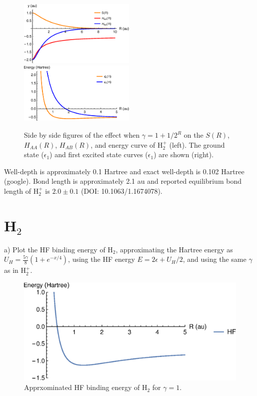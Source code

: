 \documentclass{article}
\begin{document}
\begin{figure}[H]
    \centering
    \includegraphics[width=0.495\textwidth]{h2_gamma.eps}
    \includegraphics[width=0.495\textwidth]{h2_gamma_curve.eps}
    \caption{Side by side figures of the effect when $\gamma= 1 + 1/2^R$
      on the $S(R)$, $H_{AA}(R)$, $H_{AB}(R)$, and energy curve of H$_2^+$ (left).
      The ground state ($\epsilon_1$) and first excited state curves ($\epsilon_1$)
      are shown (right).}
    \label{fig:sidebyside}
\end{figure}

{\color{blue}
  Well-depth is approximately 0.1 Hartree and exact well-depth is 0.102 Hartree
  (google).
  Bond length is approximately 2.1 au and reported equilibrium bond length
  of H$_2^+$ is $2.0\pm0.1$ (DOI: 10.1063/1.1674078).
}

\pagebreak

\section*{H$_2$}

\noindent a) Plot the HF binding energy of H$_2$, approximating the Hartree energy
as $U_H=\frac{5\gamma}{8}(1+e^{-x/4})$, using the HF energy $E=2\epsilon + U_H/2$,
and using the same $\gamma$ as in H$_2^+$.

\begin{figure}[H]
  \centering
  \includegraphics[scale=0.75]{hf_energy.eps}
  \caption{Apprxominated HF binding energy of H$_2$ for $\gamma=1$.}
\end{figure}
\end{document}

